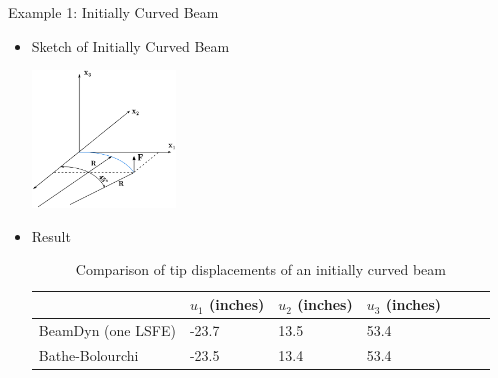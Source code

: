 \documentclass[dvips,xcolor=cmyk]{beamer}
\begin{document}
\begin{frame}{Example 1: Initially Curved Beam}
    \begin{itemize}
    \item Sketch of Initially Curved Beam
    \begin{center}
    \includegraphics[width=1.5in]{EPSF/E1Curved.eps}
    \end{center}
    \item Result
    \scriptsize
    \begin{table}
\caption{\label{E1CurvedDisp} Comparison of tip displacements of an initially curved beam } 
\begin{center}
    \begin{tabular}{| l | l | l | l | l | l | l |}
    	\hline
    	        & $u_1$ (inches) & $u_2$ (inches) & $u_3$ (inches)  \\ \hline
    	BeamDyn (one LSFE) & -23.7     & 13.5       & 53.4      \\  \hline
    	Bathe-Bolourchi \cite{Bathe1979}   & -23.5     & 13.4       & 53.4     \\ \hline
    \end{tabular}
\end{center}
\end{table} 
    \end{itemize}
\end{frame}
\end{document}
